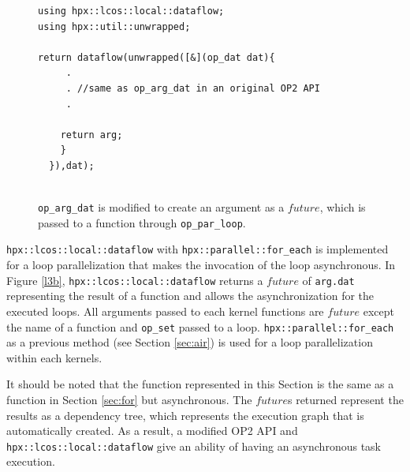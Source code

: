 \documentclass[conference]{IEEEtran}
\begin{document}
\begin{figure}
    \begin{lstlisting}    
using hpx::lcos::local::dataflow;
using hpx::util::unwrapped;    

return dataflow(unwrapped([&](op_dat dat){
     .
     . //same as op_arg_dat in an original OP2 API
     .

    return arg;
    }
  }),dat);
  
    \end{lstlisting}
    \caption{\small{\texttt{op\_arg\_dat} is modified to create an argument as a $future$, which is passed to a function through \texttt{op\_par\_loop}.}}
    \label{o2}
\end{figure}

\texttt{hpx::lcos::local::dataflow} with \texttt{hpx::parallel::for\_each} is implemented for a loop parallelization that makes the invocation of the loop asynchronous. In Figure \ref{l3b}, \texttt{hpx::lcos::local::dataflow} returns a $future$ of \texttt{arg.dat} representing the result of a function and allows the asynchronization for the executed loops. All arguments passed to each kernel functions are $future$ except the name of a function and \texttt{op\_set} passed to a loop. \texttt{hpx::parallel::for\_each} as a previous method (see Section \ref{sec:air}) is used for a loop parallelization within each kernels. 

It should be noted that the function represented in this Section is the same as a function in Section \ref{sec:for} but asynchronous. The $future$s returned represent the results as a dependency tree, which represents the execution graph that is automatically created. As a result, a modified OP2 API and \texttt{hpx::lcos::local::dataflow} give an ability of having an asynchronous task execution. 
\end{document}
